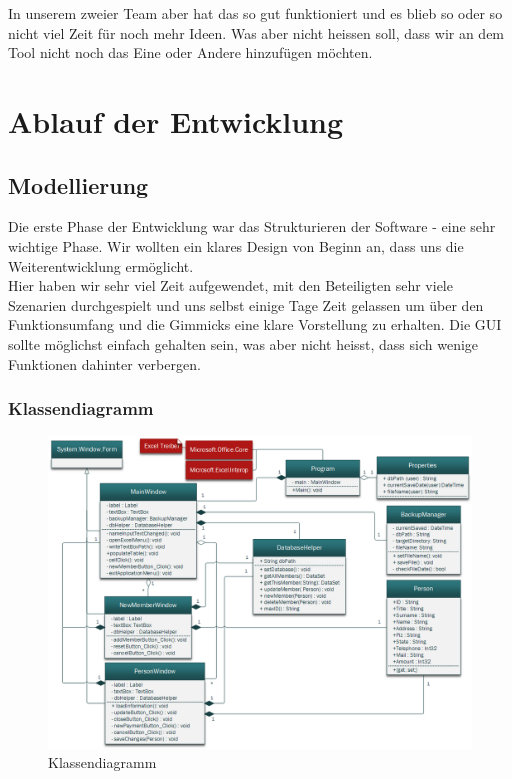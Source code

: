 \documentclass{article}
\begin{document}
In unserem zweier Team aber hat das so gut funktioniert und es blieb so oder so nicht viel Zeit für noch mehr Ideen. Was aber nicht heissen soll, dass wir an dem Tool nicht noch das Eine oder Andere hinzufügen möchten.

\newpage


\section{Ablauf der Entwicklung}

\subsection{Modellierung}
Die erste Phase der Entwicklung war das Strukturieren der Software - eine sehr wichtige Phase. Wir wollten ein klares Design von Beginn an, dass uns die Weiterentwicklung ermöglicht.\\
Hier haben wir sehr viel Zeit aufgewendet, mit den Beteiligten sehr viele Szenarien durchgespielt und uns selbst einige Tage Zeit gelassen um über den Funktionsumfang und die Gimmicks eine klare Vorstellung zu erhalten. Die GUI sollte möglichst einfach gehalten sein, was aber nicht heisst, dass sich wenige Funktionen dahinter verbergen. 

\subsubsection{Klassendiagramm}
	
\begin{figure}[h]
	\centering
	\includegraphics[width=1 \textwidth]{KlassendiagrammBild}
	\caption{Klassendiagramm}
\end{figure}
\end{document}
